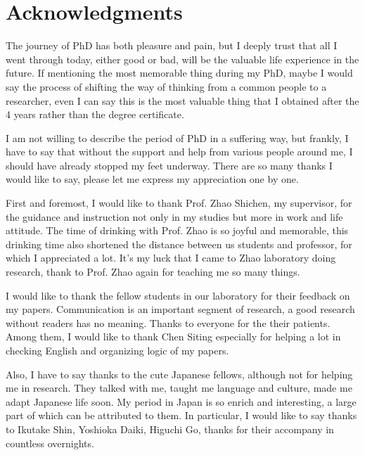 \documentclass[12pt, twoside, a4paper]{book} %
\renewcommand{\baselinestretch}{1.5} %
\begin{document}
\frontmatter

\renewcommand{\baselinestretch}{1.6} %
\fontsize{13pt}{13pt} %
\selectfont

\chapter{Acknowledgments}
The journey of PhD has both pleasure and pain, but I deeply trust that all I went through today, either good or bad, will be the valuable life experience in the future. If mentioning the most memorable thing during my PhD, maybe I would say the process of shifting the way of thinking from a common people to a researcher, even I can say this is the most valuable thing that I obtained after the 4 years rather than the degree certificate.

I am not willing to describe the period of PhD in a suffering way, but frankly, I have to say that without the support and help from various people around me, I should have already stopped my feet underway. There are so many thanks I would like to say, please let me express my appreciation one by one.

First and foremost, I would like to thank Prof. Zhao Shichen, my supervisor, for the guidance and instruction not only in my studies but more in work and life attitude. The time of drinking with Prof. Zhao is so joyful and memorable, this drinking time also shortened the distance between us students and professor, for which I appreciated a lot. It's my luck that I came to Zhao laboratory doing research, thank to Prof. Zhao again for teaching me so many things.

I would like to thank the fellow students in our laboratory for their feedback on my papers. Communication is an important segment of research, a good research without readers has no meaning. Thanks to everyone for the their patients. Among them, I would like to thank Chen Siting especially for helping a lot in checking English and organizing logic of my papers. 

Also, I have to say thanks to the cute Japanese fellows, although not for helping me in research. They talked with me, taught me language and culture, made me adapt Japanese life soon. My period in Japan is so enrich and interesting, a large part of which can be attributed to them. In particular, I would like to say thanks to Ikutake Shin, Yoshioka Daiki, Higuchi Go, thanks for their accompany in countless overnights.
\end{document}
